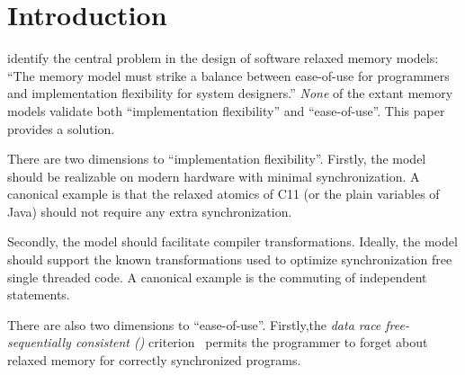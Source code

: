 \section{Introduction}
\citet{Manson:2005:JMM:1047659.1040336} identify the central problem in the design of software relaxed memory models: ``The memory model must strike a balance between ease-of-use for programmers and implementation flexibility for system designers.''   \emph{None} of the extant memory models validate both ``implementation flexibility'' and ``ease-of-use''.   This paper provides a solution.


There are two dimensions to ``implementation flexibility''.  Firstly, the model should be realizable on modern hardware with minimal synchronization.  A canonical example is that the relaxed atomics of C11 (or the plain variables of Java) should not require any extra synchronization.

Secondly, the  model should facilitate compiler transformations.    Ideally, the model should support the known transformations used to optimize  synchronization free single threaded code.  A canonical example is the  commuting of independent statements.


There are also two dimensions to ``ease-of-use''.  Firstly,the \emph{data race free-sequentially consistent (\drfsc)} criterion~\cite{DBLP:journals/tpds/AdveH93, DBLP:conf/isca/AdveH90} permits the programmer to forget about relaxed memory for correctly synchronized programs.

